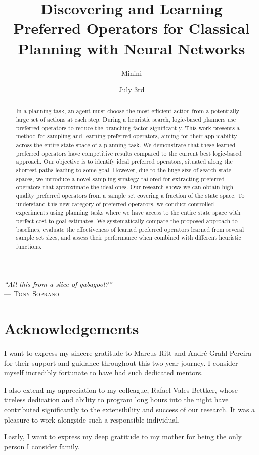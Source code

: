 \documentclass[ppgc,diss,english]{iiufrgs}
\title{Discovering and Learning Preferred Operators for Classical Planning with Neural Networks}
\author{Minini}{Pedro Probst}
\date{July 3rd}{2023}
\begin{document}
\maketitle

\clearpage
\begin{flushright}
\mbox{}\vfill
{\sffamily\itshape
    ``All this from a slice of gabagool?''\\}
--- \textsc{Tony Soprano}
\end{flushright}

\chapter*{Acknowledgements}

I want to express my sincere gratitude to Marcus Ritt and André Grahl Pereira for their support and guidance throughout this two-year journey. I consider myself incredibly fortunate to have had such dedicated mentors.

I also extend my appreciation to my colleague, Rafael Vales Bettker, whose tireless dedication and ability to program long hours into the night have contributed significantly to the extensibility and success of our research. It was a pleasure to work alongside such a responsible individual.

Lastly, I want to express my deep gratitude to my mother for being the only person I consider family.

\begin{abstract}
In a planning task, an agent must choose the most efficient action from a potentially large set of actions at each step. During a heuristic search, logic-based planners use preferred operators to reduce the branching factor significantly. This work presents a method for sampling and learning preferred operators, aiming for their applicability across the entire state space of a planning task. We demonstrate that these learned preferred operators have competitive results compared to the current best logic-based approach.
Our objective is to identify ideal preferred operators, situated along the shortest paths leading to some goal. However, due to the huge size of search state spaces, we introduce a novel sampling strategy tailored for extracting preferred operators that approximate the ideal ones. Our research shows we can obtain high-quality preferred operators from a sample set covering a fraction of the state space.
To understand this new category of preferred operators, we conduct controlled experiments using planning tasks where we have access to the entire state space with perfect cost-to-goal estimates. We systematically compare the proposed approach to baselines, evaluate the effectiveness of learned preferred operators learned from several sample set sizes, and assess their performance when combined with different heuristic functions.
\end{abstract}
\end{document}
